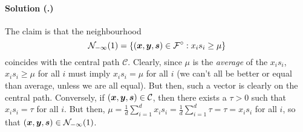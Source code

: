 \documentclass{article}
\newcounter{problemSheetNumber}
\newcounter{problems}
\renewcommand{\solution}[1]{\paragraph{Solution (\theproblemSheetNumber.\theproblems)}\addtocounter{problems}{1}\label{#1}}
\begin{document}
\solution{pr:3} The claim is that the neighbourhood
\begin{equation*}
 \mathcal{N}_{-\infty}(1) = \{(\bm{x},\bm{y},\bm{s})\in \mathcal{F}^{\circ} \mathrel{\mathop{:}} x_is_i\geq \mu\}
\end{equation*}
coincides with the central path $\mathcal{C}$. Clearly, since $\mu$ is the {\em average} of the $x_is_i$,
$x_is_i\geq \mu$ for all $i$ must imply $x_is_i=\mu$ for all $i$ (we can't all be better or equal than average, unless we are all equal). But then, such a vector is clearly on the central path. Conversely, if $(\bm{x},\bm{y},\bm{s})\in \mathcal{C}$, then there exists a $\tau>0$ such that $x_is_i=\tau$ for all $i$. But then, $\mu = \frac{1}{d}\sum_{i=1}^d x_is_i = \frac{1}{d}\sum_{i=1}^d \tau = \tau = x_is_i$ for all $i$, so that $(\bm{x},\bm{y},\bm{s})\in \mathcal{N}_{-\infty}(1)$. 
\end{document}
